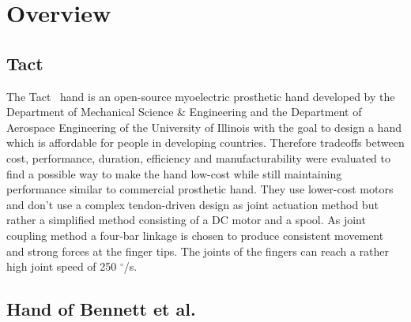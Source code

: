 \documentclass[a4paper, 10pt, conference]{ieeeconf}      %
\begin{document}
\section{Overview}

\subsection{Tact}

The Tact~\cite{tact} hand is an open-source myoelectric prosthetic hand developed by the Department of Mechanical Science \& Engineering and the Department of Aerospace Engineering of the University of Illinois with the goal to design a hand which is affordable for people in developing countries. Therefore tradeoffs between cost, performance, duration, efficiency and manufacturability were evaluated to find a possible way to make the hand low-cost while still maintaining performance similar to commercial prosthetic hand. They use lower-cost motors and don't use a complex tendon-driven design as joint actuation method but rather a simplified method consisting of a DC motor and a spool. As joint coupling method a four-bar linkage is chosen to produce consistent movement and strong forces at the finger tips. The joints of the fingers can reach a rather high joint speed of 250 $^\circ$/s.

\subsection{Hand of Bennett et al.}
\end{document}
